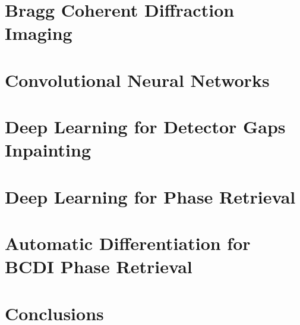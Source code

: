 \documentclass[12pt]{book}
\begin{document}
\mainmatter



\fancyhead[RO]{\leftmark}
\fancyhead[LE]{\textsc{\chaptername~\thechapter}}

\label{chap:introduction}


\chapter{Bragg Coherent Diffraction Imaging}
\label{chap:bcdi}


\chapter{Convolutional Neural Networks}
\label{chap:dl_theory}


\chapter{Deep Learning for Detector Gaps Inpainting}
\label{chap:inpainting}


\chapter{Deep Learning for Phase Retrieval}
\label{chap:phase_retrieval}


\chapter{Automatic Differentiation for BCDI Phase Retrieval}
\label{chap:AD_phase_retrieval}


\chapter{Conclusions}
\label{chap:conclusions}

\end{document}

